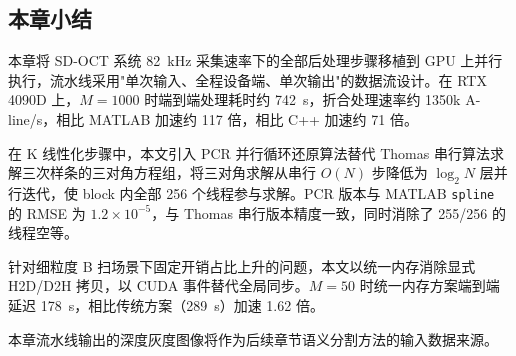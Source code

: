 \subsection{本章小结}

本章将 SD-OCT 系统 82~kHz 采集速率下的全部后处理步骤移植到 GPU 上并行执行，流水线采用"单次输入、全程设备端、单次输出"的数据流设计。在 RTX 4090D 上，$M = 1000$ 时端到端处理耗时约 742~\textmu s，折合处理速率约 1350k A-line/s，相比 MATLAB 加速约 117 倍，相比 C++ 加速约 71 倍。

在 K 线性化步骤中，本文引入 PCR 并行循环还原算法替代 Thomas 串行算法求解三次样条的三对角方程组，将三对角求解从串行 $O(N)$ 步降低为 $\log_2 N$ 层并行迭代，使 block 内全部 256 个线程参与求解。PCR 版本与 MATLAB \texttt{spline} 的 RMSE 为 $1.2 \times 10^{-5}$，与 Thomas 串行版本精度一致，同时消除了 255/256 的线程空等。

针对细粒度 B 扫场景下固定开销占比上升的问题，本文以统一内存消除显式 H2D/D2H 拷贝，以 CUDA 事件替代全局同步。$M = 50$ 时统一内存方案端到端延迟 178~\textmu s，相比传统方案（289~\textmu s）加速 1.62 倍。

本章流水线输出的深度灰度图像将作为后续章节语义分割方法的输入数据来源。
